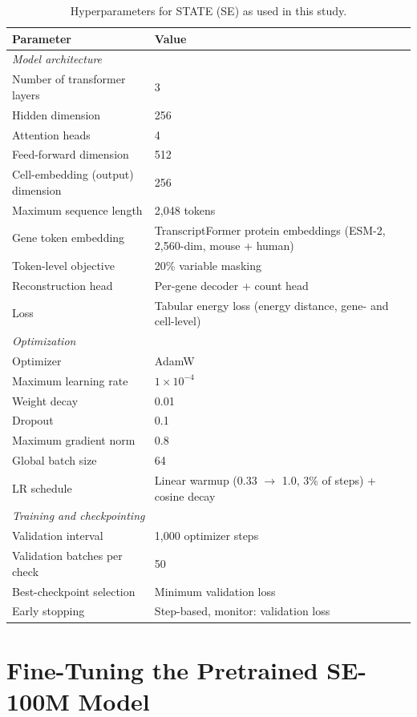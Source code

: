 \documentclass{article}
\begin{document}
\begin{table}[!htbp]
\centering
\caption{Hyperparameters for STATE (SE) as used in this study.}
\label{tab:state_params}
\small
\begin{tabular}{ll}
\toprule
\textbf{Parameter} & \textbf{Value} \\
\midrule
\multicolumn{2}{l}{\textit{Model architecture}} \\
Number of transformer layers & 3 \\
Hidden dimension & 256 \\
Attention heads & 4 \\
Feed-forward dimension & 512 \\
Cell-embedding (output) dimension & 256 \\
Maximum sequence length & 2{,}048 tokens \\
Gene token embedding & TranscriptFormer protein embeddings (ESM-2, 2{,}560-dim, mouse + human) \\
Token-level objective & 20\% variable masking \\
Reconstruction head & Per-gene decoder + count head \\
Loss & Tabular energy loss (energy distance, gene- and cell-level) \\
\midrule
\multicolumn{2}{l}{\textit{Optimization}} \\
Optimizer & AdamW \\
Maximum learning rate & $1 \times 10^{-4}$ \\
Weight decay & 0.01 \\
Dropout & 0.1 \\
Maximum gradient norm & 0.8 \\
Global batch size & 64 \\
LR schedule & Linear warmup (0.33 $\to$ 1.0, 3\% of steps) + cosine decay \\
\midrule
\multicolumn{2}{l}{\textit{Training and checkpointing}} \\
Validation interval & 1{,}000 optimizer steps \\
Validation batches per check & 50 \\
Best-checkpoint selection & Minimum validation loss \\
Early stopping & Step-based, monitor: validation loss \\
\bottomrule
\end{tabular}
\end{table}

\FloatBarrier

\section{Fine-Tuning the Pretrained SE-100M Model}
\end{document}
